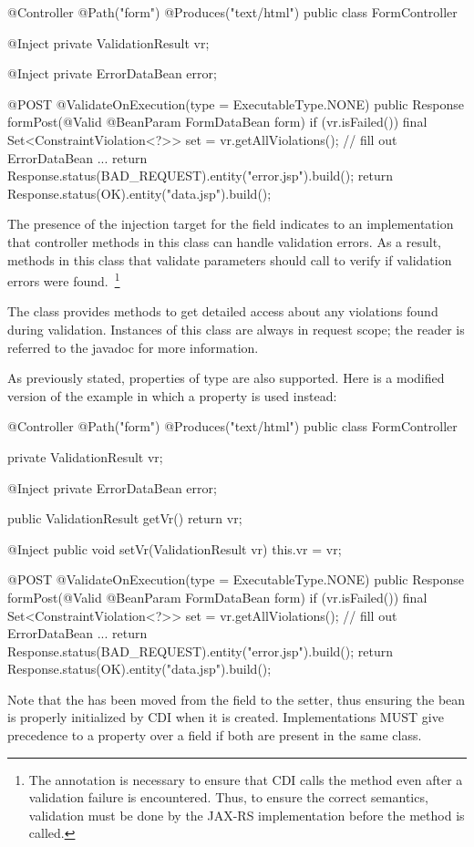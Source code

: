 \begin{listing}{1}
@Controller
@Path("form")
@Produces("text/html")
public class FormController {

    @Inject
    private ValidationResult vr;
    
    @Inject
    private ErrorDataBean error;

    @POST
    @ValidateOnExecution(type = ExecutableType.NONE)
    public Response formPost(@Valid @BeanParam FormDataBean form) {
        if (vr.isFailed()) {
            final Set<ConstraintViolation<?>> set = vr.getAllViolations();
            // fill out ErrorDataBean ...
            return Response.status(BAD_REQUEST).entity("error.jsp").build();
        }
        return Response.status(OK).entity("data.jsp").build();    
    }
}
\end{listing}

The presence of the injection target for the field 
 indicates to an implementation that controller methods in this
class can handle validation errors. As a result, methods in this class
that validate parameters should call  to verify if
validation errors were found.~\footnote{The  
annotation is necessary to ensure that CDI calls the method even after 
a validation failure is encountered. Thus, to ensure the correct semantics, 
validation  must be done by the JAX-RS implementation before the method 
is called.}

The class 
provides methods to get detailed access about any violations 
found during validation. Instances of this class are always in request
scope; the reader is referred to the javadoc for more information.

As previously stated, properties of type 
are also supported. Here is a modified version of the example in which
a property is used instead:

\begin{listing}{1}
@Controller
@Path("form")
@Produces("text/html")
public class FormController {

    private ValidationResult vr;
    
    @Inject
    private ErrorDataBean error;
    
    public ValidationResult getVr() {
        return vr;
    }

    @Inject
    public void setVr(ValidationResult vr) {
        this.vr = vr;
    }

    @POST
    @ValidateOnExecution(type = ExecutableType.NONE)
    public Response formPost(@Valid @BeanParam FormDataBean form) {
        if (vr.isFailed()) {
            final Set<ConstraintViolation<?>> set = vr.getAllViolations();
            // fill out ErrorDataBean ...
            return Response.status(BAD_REQUEST).entity("error.jsp").build();
        }
        return Response.status(OK).entity("data.jsp").build();    
    }
}
\end{listing}

Note that the  has been moved from the field to the setter,
thus ensuring the bean is properly initialized by CDI when it is
created. Implementations MUST give precedence to a property over a field
if both are present in the same class.
 


